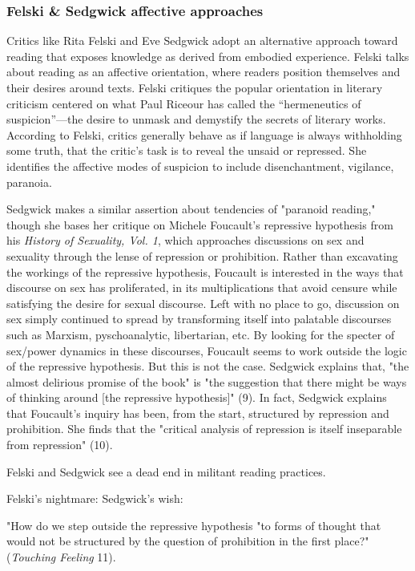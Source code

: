 \documentclass[11pt]{article}
\begin{document}
\subsubsection{Felski \& Sedgwick affective approaches}
\label{sec:org979d359}

Critics like Rita Felski and Eve Sedgwick adopt an alternative
approach toward reading that exposes knowledge as derived from
embodied experience. Felski talks about reading as an affective
orientation, where readers position themselves and their desires
around texts. Felski critiques the popular orientation in literary
criticism centered on what Paul Riceour has called the “hermeneutics
of suspicion”---the desire to unmask and demystify the secrets of
literary works. According to Felski, critics generally behave as if
language is always withholding some truth, that the critic’s task is
to reveal the unsaid or repressed. She identifies the affective modes
of suspicion to include disenchantment, vigilance, paranoia. 

Sedgwick makes a similar assertion about tendencies of "paranoid
reading," though she bases her critique on Michele Foucault's
repressive hypothesis from his \emph{History of Sexuality, Vol. 1}, which
approaches discussions on sex and sexuality through the lense of
repression or prohibition. Rather than excavating the workings of the
repressive hypothesis, Foucault is interested in the ways that
discourse on sex has proliferated, in its multiplications that avoid
censure while satisfying the desire for sexual discourse. Left with no
place to go, discussion on sex simply continued to spread by
transforming itself into palatable discourses such as Marxism,
pyschoanalytic, libertarian, etc. By looking for the specter of
sex/power dynamics in these discourses, Foucault seems to work outside
the logic of the repressive hypothesis. But this is not the
case. Sedgwick explains that, "the almost delirious promise of the
book" is "the suggestion that there might be ways of thinking around
[the repressive hypothesis]" (9). In fact, Sedgwick explains that
Foucault's inquiry has been, from the start, structured by repression
and prohibition. She finds that the "critical analysis of repression
is itself inseparable from repression" (10). 

Felski and Sedgwick see a dead end in militant reading practices. 

Felski's nightmare: 
Sedgwick's wish: 

"How do we step outside the repressive hypothesis "to forms of thought
that would not be structured by the question of prohibition in the
first place?" (\emph{Touching Feeling} 11).
\end{document}
